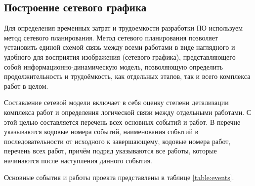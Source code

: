 \subsection{Построение сетевого графика} \label{net_graph}

Для определения временных затрат и трудоемкости разработки ПО используем метод сетевого планирования. Метод сетевого планирования позволяет установить единой схемой связь между всеми работами в виде наглядного и удобного для восприятия изображения (сетевого графика), представляющего собой информационно-динамическую модель, позволяющую определить продолжительность и трудоёмкость, как отдельных этапов, так и всего комплекса работ в целом.

\vspace{\baselineskip}
Составление сетевой модели включает в себя оценку степени детализации комплекса работ и определения логической связи между отдельными работами.
С этой целью составляется перечень всех основных событий и работ. В перечне указываются кодовые номера событий, наименования событий в последовательности от исходного к завершающему, кодовые номера работ, перечень всех работ, причём подряд указываются все работы, которые начинаются после наступления данного события.

\vspace{\baselineskip}
Основные события и работы проекта представлены в таблице \ref{table:events}.

%   

